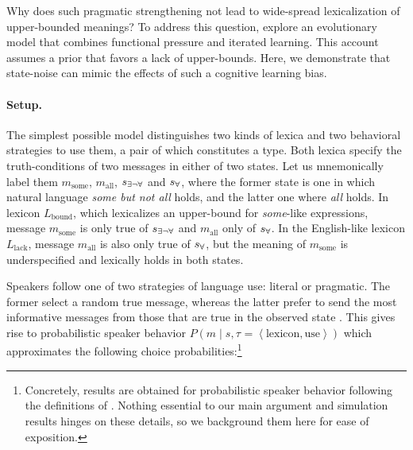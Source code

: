 \documentclass[10pt,a4paper]{article}
\newcommand{\tuple}[1]{\ensuremath{\left\langle #1 \right\rangle}}
\newcommand{\state}{\ensuremath{s}\xspace}		%
\newcommand{\mystate}[1]{\ensuremath{\state_{\text{#1}}}\xspace} %
\newcommand{\messg}{\ensuremath{m}\xspace}		%
\newcommand{\mymessg}[1]{\ensuremath{\messg_{\text{#1}}}\xspace} %
\newcommand{\ssome}{\mystate{\ensuremath{\exists\neg\forall}}}
\newcommand{\sall}{\mystate{\ensuremath{\forall}}}
\newcommand{\msome}{\mymessg{some}}
\newcommand{\mall}{\mymessg{all}}
\newcommand{\type}[1]{\ensuremath{\tau_{#1}}}
\begin{document}
Why does such pragmatic strengthening not lead to wide-spread lexicalization of upper-bounded
meanings? To address this question, \citet{brochhagen+etal:2016:CogSci} explore an evolutionary
model that combines functional pressure and iterated learning.  This account assumes a prior
that favors a lack of upper-bounds. Here, we demonstrate that state-noise can mimic the effects
of such a cognitive learning bias.

\paragraph{Setup.} The simplest possible model distinguishes two kinds of lexica and two
behavioral strategies to use them, a pair of which constitutes a type. Both lexica specify the
truth-conditions of two messages in either of two states. Let us mnemonically label them
$\msome$, $\mall$, $\ssome$ and $\sall$, where the former state is one in which natural
language {\em some but not all} holds, and the latter one where {\em all} holds. In lexicon
$L_{\text{bound}}$, which lexicalizes an upper-bound for {\em some}-like expressions, message $\msome$ is only true of $\ssome$ and $\mall$ only of $\sall$. In
the English-like lexicon $L_{\text{lack}}$, message $\mall$ is also only true of $\sall$, but the
meaning of $\msome$ is underspecified and lexically holds in both states. 

Speakers follow one of two strategies of language use: literal or pragmatic. The former select a random true
message, whereas the latter prefer to send the most informative messages from those that are true in
the observed state \citep{grice:1975}. This gives rise to probabilistic speaker behavior
$P(m \mid s,\type{}= \tuple{\text{lexicon},\text{use}})$ which approximates the following choice
probabilities:\footnote{Concretely, results are obtained for probabilistic speaker behavior
  following the definitions of \citet{brochhagen+etal:2016:CogSci}. Nothing essential to our
  main argument and simulation results hinges on these details, so we background them here for
  ease of exposition.}
\end{document}
